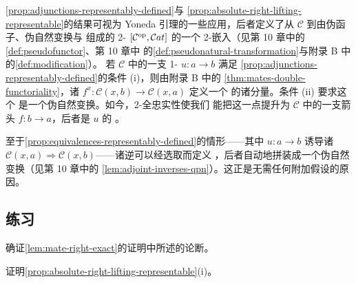\begin{remark}\label{rem:yoneda-perspective}
\cref{prop:adjunctions-representably-defined}与
\cref{prop:absolute-right-lifting-representable}的结果可视为\trBicategorical{} Yoneda
引理的一些应用，后者定义了从\trBicategory{} $\mathcal{C}$ 到由伪函子、伪自然变换与%
\trModification{}组成的 2-\trCategory{} $[\mathcal{C}^{\mathrm{op}},\mathcal{C}at]$ 的一个%
2-\trFullyFaithful{}嵌入（见第 10 章中的\cref{def:pseudofunctor}、第 10 章中
的\cref{def:pseudonatural-transformation}与附录 B 中的\cref{def:modification}）。
若 $\mathcal{C}$ 中的一支 1-\trCell{} $u\colon a\to b$ 满足%
\cref{prop:adjunctions-representably-defined}的条件 (i)，则由附录 B 中的%
\cref{thm:mates-double-functoriality}，诸\trLeftAdjoint{}
$f^{x}\colon\mathcal{C}(x,b)\to\mathcal{C}(x,a)$ 定义一个%
\trOplax\trNaturalTransformation{}的诸分量。条件 (ii) 要求这个%
\trOplax\trNaturalTransformation{}是一个伪自然变换。如今，2-全忠实性使我们
能把这一点提升为 $\mathcal{C}$ 中的一支箭头 $f\colon b\to a$，后者是 $u$ 的%
\trLeftAdjoint。

至于\cref{prop:equivalences-representably-defined}的情形——其中
$u\colon a\to b$ 诱导诸\trEquivalence{}
$\mathcal{C}(x,a)\Rightarrow\mathcal{C}(x,b)$——诸逆可以经选取而定义%
\trAdjointEquivalence，后者自动地拼装成一个伪自然变换（见第 10 章中的%
\cref{lem:adjoint-inverses-qpn}）。这正是无需任何附加假设的原因。
\end{remark}

\subsection*{练习}

\begin{exercise}\label{ex:confirm-mate-assertion}
确证\cref{lem:mate-right-exact}的证明中所述的论断。
\end{exercise}

\begin{exercise}\label{ex:prove-representable-absolute-lifting}
证明\cref{prop:absolute-right-lifting-representable}(i)。
\end{exercise}

